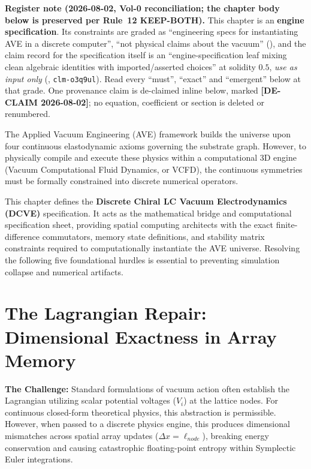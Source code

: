 \noindent\textbf{Register note (2026-08-02, Vol-0 reconciliation; the chapter body below is preserved per Rule~12 KEEP-BOTH).} This chapter is an \textbf{engine specification}. Its constraints are graded as ``engineering specs for instantiating AVE in a discrete computer'', ``not physical claims about the vacuum'' (), and the claim record for the specification itself is an ``engine-specification leaf mixing clean algebraic identities with imported/asserted choices'' at solidity $0.5$, \emph{use as input only} (, \texttt{clm-o3q9ul}). Read every ``must'', ``exact'' and ``emergent'' below at that grade. One provenance claim is de-claimed inline below, marked \textbf{[DE-CLAIM 2026-08-02]}; no equation, coefficient or section is deleted or renumbered.

The Applied Vacuum Engineering (AVE) framework builds the universe upon four continuous elastodynamic axioms governing the substrate graph. However, to physically compile and execute these physics within a computational 3D engine (Vacuum Computational Fluid Dynamics, or VCFD), the continuous symmetries must be formally constrained into discrete numerical operators. 

This chapter defines the \textbf{Discrete Chiral LC Vacuum Electrodynamics (DCVE)} specification. It acts as the mathematical bridge and computational specification sheet, providing spatial computing architects with the exact finite-difference commutators, memory state definitions, and stability matrix constraints required to computationally instantiate the AVE universe. Resolving the following five foundational hurdles is essential to preventing simulation collapse and numerical artifacts.

\section{The Lagrangian Repair: Dimensional Exactness in Array Memory}

\textbf{The Challenge:} Standard formulations of vacuum action often establish the Lagrangian utilizing scalar potential voltages ($V_i$) at the lattice nodes. For continuous closed-form theoretical physics, this abstraction is permissible. However, when passed to a discrete physics engine, this produces dimensional mismatches across spatial array updates ($\Delta x = \ell_{node}$), breaking energy conservation and causing catastrophic floating-point entropy within Symplectic Euler integrations.

